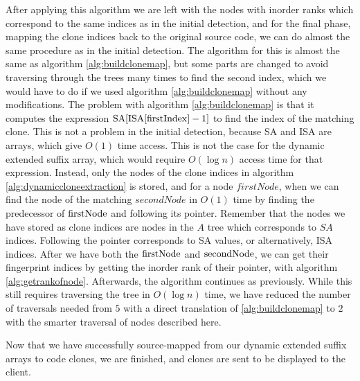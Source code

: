 After applying this algorithm we are left with the nodes with inorder ranks which
correspond to the same indices as in the initial detection, and for the final phase,
mapping the clone indices back to the original source code, we can do almost the same
procedure as in the initial detection. The algorithm for this is almost the same as
algorithm \ref{alg:buildclonemap}, but some parts are changed to avoid traversing through
the trees many times to find the second index, which we would have to do if we used
algorithm \ref{alg:buildclonemap} without any modifications. The problem with algorithm
\ref{alg:buildclonemap} is that it computes the expression $\mathrm{SA}[{\mathrm{ISA}[{\mathrm{firstIndex}}] -
1}]$ to find the index of the matching clone. This is not a problem in the initial
detection, because SA and ISA are arrays, which give $O(1)$ time access. This is not the
case for the dynamic extended suffix array, which would require $O(\log n)$ access time
for that expression. Instead, only the nodes of the clone indices in algorithm
\ref{alg:dynamiccloneextraction} is stored, and for a node $firstNode$, when we can find
the node of the matching $secondNode$ in $O(1)$ time by finding the predecessor of
$\mathrm{firstNode}$ and following its pointer. Remember that the nodes we have stored as
clone indices are nodes in the $A$ tree which corresponds to $SA$ indices. Following the
pointer corresponds to SA values, or alternatively, ISA indices. After we have both the
$\mathrm{firstNode}$ and $\mathrm{secondNode}$, we can get their fingerprint indices by getting
the inorder rank of their pointer, with algorithm \ref{alg:getrankofnode}. Afterwards, the
algorithm continues as previously. While this still requires traversing the tree in
$O(\log n)$ time, we have reduced the number of traversals needed from $5$ with a direct
translation of \ref{alg:buildclonemap} to $2$ with the smarter traversal of nodes
described here.

Now that we have successfully source-mapped from our dynamic extended suffix arrays to
code clones, we are finished, and clones are sent to be displayed to the client.
